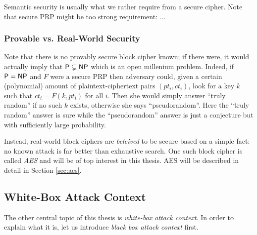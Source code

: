 Semantic security is usually what we rather require from a secure cipher. Note that secure PRP might be too strong requirement: ...


\subsubsection{Provable vs. Real-World Security}

Note that there is no provably secure block cipher known; if there were, it would actually imply that $\mathsf{P} \subsetneq \mathsf{NP}$ which is an open millenium problem. Indeed, if $\mathsf{P} = \mathsf{NP}$ and $F$ were a secure PRP then adversary could, given a certain (polynomial) amount of plaintext-ciphertext pairs $(pt_i,ct_i)$, look for a key $k$ such that $ct_i = F(k,pt_i)$ for all $i$. Then she would simply answer ``truly random'' if no such $k$ exists, otherwise she says ``pseudorandom''. Here the ``truly random'' answer is sure while the ``pseudorandom'' answer is just a conjecture but with sufficiently large probability.

Instead, real-world block ciphers are {\em beleived} to be secure based on a simple fact: no known attack is far better than exhaustive search. One such block cipher is called {\em AES} and will be of top interest in this thesis. AES will be described in detail in Section \ref{sec:aes}.



\subsection{White-Box Attack Context}

The other central topic of this thesis is {\em white-box attack context}. In order to explain what it is, let us introduce {\em black box attack context} first.

